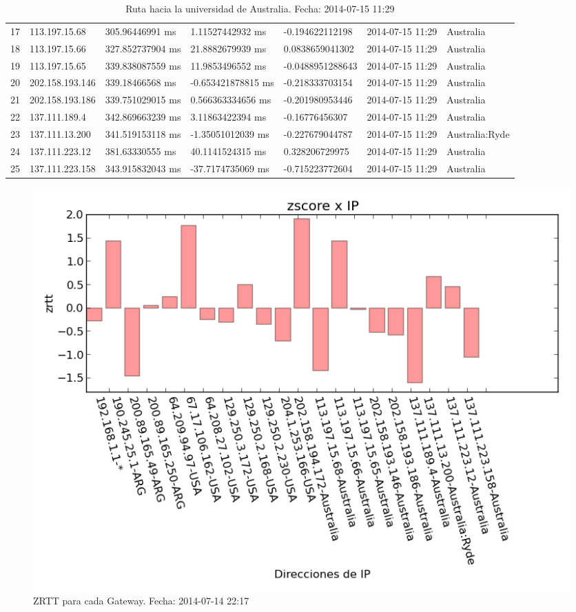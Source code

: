 \begin{table}[h]
{\begin{tabular}{lllllll}
17  & 113.197.15.68   & 305.96446991 ms  & 1.11527442932 ms   & -0.194622112198  & 2014-07-15 11:29 & Australia               \\
18  & 113.197.15.66   & 327.852737904 ms & 21.8882679939 ms   & 0.0838659041302  & 2014-07-15 11:29 & Australia               \\
19  & 113.197.15.65   & 339.838087559 ms & 11.9853496552 ms   & -0.0488951288643 & 2014-07-15 11:29 & Australia               \\
20  & 202.158.193.146 & 339.18466568 ms  & -0.653421878815 ms & -0.218333703154  & 2014-07-15 11:29 & Australia               \\
21  & 202.158.193.186 & 339.751029015 ms & 0.566363334656 ms  & -0.201980953446  & 2014-07-15 11:29 & Australia               \\
22  & 137.111.189.4   & 342.869663239 ms & 3.11863422394 ms   & -0.16776456307   & 2014-07-15 11:29 & Australia               \\
23  & 137.111.13.200  & 341.519153118 ms & -1.35051012039 ms  & -0.227679044787  & 2014-07-15 11:29 & Australia:Ryde          \\
24  & 137.111.223.12  & 381.63330555 ms  & 40.1141524315 ms   & 0.328206729975   & 2014-07-15 11:29 & Australia               \\
25  & 137.111.223.158 & 343.915832043 ms & -37.7174735069 ms  & -0.715223772604  & 2014-07-15 11:29 & Australia              
\end{tabular}
}
\caption{Ruta hacia la universidad de Australia. Fecha: 2014-07-15 11:29}
\label{my-label}
\end{table}


\begin{figure}[H]
	\begin{center}
		  \includegraphics[scale=0.5]{../graficos_informe/mq_zscore.png}
		  \caption{ZRTT para cada Gateway. Fecha: 2014-07-14 22:17}
		  \label{fig:contra1}
	\end{center}
\end{figure}

